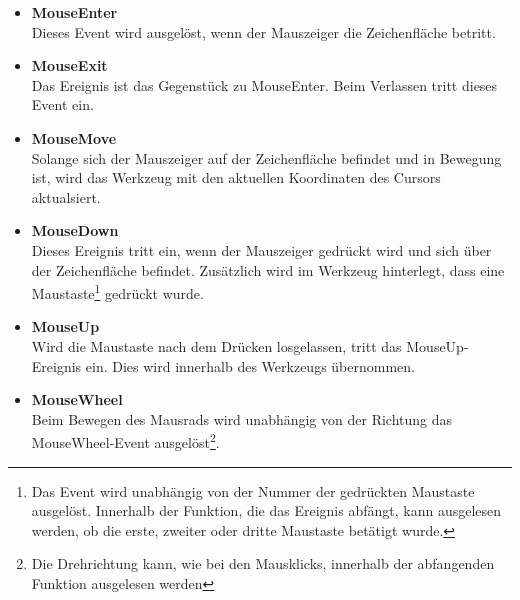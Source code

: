 \begin{itemize}
\item \textbf{MouseEnter} \\
	Dieses Event wird ausgelöst, wenn der Mauszeiger die Zeichenfläche betritt.
\item \textbf{MouseExit} \\
	Das Ereignis ist das Gegenstück zu MouseEnter. Beim Verlassen tritt dieses Event ein.
\item \textbf{MouseMove} \\
	Solange sich der Mauszeiger auf der Zeichenfläche befindet und in Bewegung ist, wird das Werkzeug mit den aktuellen Koordinaten des Cursors aktualsiert.
\item \textbf{MouseDown} \\
	Dieses Ereignis tritt ein, wenn der Mauszeiger gedrückt wird und sich über der Zeichenfläche befindet. Zusätzlich wird im Werkzeug hinterlegt, dass eine Maustaste\footnote{Das Event wird unabhängig von der Nummer der gedrückten Maustaste ausgelöst. Innerhalb der Funktion, die das Ereignis abfängt, kann ausgelesen werden, ob die erste, zweiter oder dritte Maustaste betätigt wurde.} gedrückt wurde.
\item \textbf{MouseUp} \\
	Wird die Maustaste nach dem Drücken losgelassen, tritt das MouseUp-Ereignis ein. Dies wird innerhalb des Werkzeugs übernommen.
\item \textbf{MouseWheel} \\
	Beim Bewegen des Mausrads wird unabhängig von der Richtung das MouseWheel-Event ausgelöst\footnote{Die Drehrichtung kann, wie bei den Mausklicks, innerhalb der abfangenden Funktion ausgelesen werden}.
\end{itemize}

